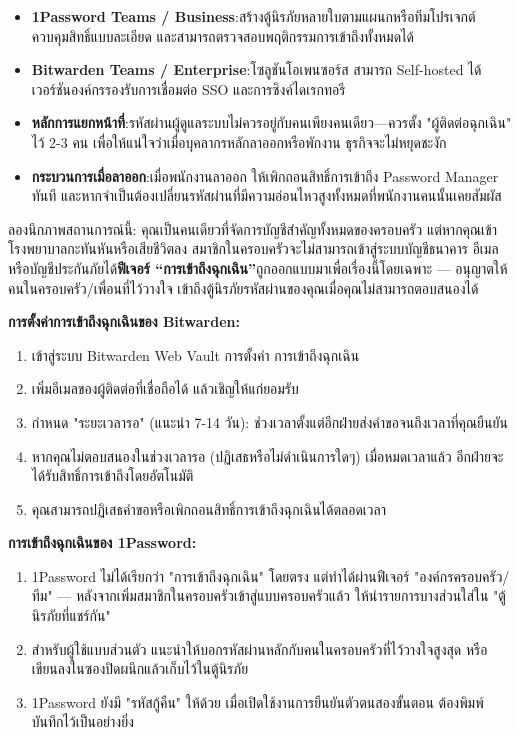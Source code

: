 \begin{itemize}
  \item \textbf{1Password Teams / Business}:สร้างตู้นิรภัยหลายใบตามแผนกหรือทีมโปรเจกต์ ควบคุมสิทธิ์แบบละเอียด และสามารถตรวจสอบพฤติกรรมการเข้าถึงทั้งหมดได้
  \item \textbf{Bitwarden Teams / Enterprise}:โซลูชันโอเพนซอร์ส สามารถ Self-hosted ได้ เวอร์ชันองค์กรรองรับการเชื่อมต่อ SSO และการซิงค์ไดเรกทอรี
  \item \textbf{หลักการแยกหน้าที่}:รหัสผ่านผู้ดูแลระบบไม่ควรอยู่กับคนเพียงคนเดียว—ควรตั้ง "ผู้ติดต่อฉุกเฉิน" ไว้ 2-3 คน เพื่อให้แน่ใจว่าเมื่อบุคลากรหลักลาออกหรือพักงาน ธุรกิจจะไม่หยุดชะงัก
  \item \textbf{กระบวนการเมื่อลาออก}:เมื่อพนักงานลาออก ให้เพิกถอนสิทธิ์การเข้าถึง Password Manager ทันที และหากจำเป็นต้องเปลี่ยนรหัสผ่านที่มีความอ่อนไหวสูงทั้งหมดที่พนักงานคนนั้นเคยสัมผัส
\end{itemize}


ลองนึกภาพสถานการณ์นี้: คุณเป็นคนเดียวที่จัดการบัญชีสำคัญทั้งหมดของครอบครัว แต่หากคุณเข้าโรงพยาบาลกะทันหันหรือเสียชีวิตลง สมาชิกในครอบครัวจะไม่สามารถเข้าสู่ระบบบัญชีธนาคาร อีเมล หรือบัญชีประกันภัยได้\textbf{ฟีเจอร์ “การเข้าถึงฉุกเฉิน”}ถูกออกแบบมาเพื่อเรื่องนี้โดยเฉพาะ — อนุญาตให้คนในครอบครัว/เพื่อนที่ไว้วางใจ เข้าถึงตู้นิรภัยรหัสผ่านของคุณเมื่อคุณไม่สามารถตอบสนองได้

\textbf{การตั้งค่าการเข้าถึงฉุกเฉินของ Bitwarden:}

\begin{enumerate}
  \item เข้าสู่ระบบ Bitwarden Web Vault การตั้งค่า การเข้าถึงฉุกเฉิน
  \item เพิ่มอีเมลของผู้ติดต่อที่เชื่อถือได้ แล้วเชิญให้แก่ยอมรับ
  \item กำหนด "ระยะเวลารอ" (แนะนำ 7-14 วัน): ช่วงเวลาตั้งแต่อีกฝ่ายส่งคำขอจนถึงเวลาที่คุณยืนยัน
  \item หากคุณไม่ตอบสนองในช่วงเวลารอ (ปฏิเสธหรือไม่ดำเนินการใดๆ) เมื่อหมดเวลาแล้ว อีกฝ่ายจะได้รับสิทธิ์การเข้าถึงโดยอัตโนมัติ
  \item คุณสามารถปฏิเสธคำขอหรือเพิกถอนสิทธิ์การเข้าถึงฉุกเฉินได้ตลอดเวลา
\end{enumerate}

\textbf{การเข้าถึงฉุกเฉินของ 1Password:}

\begin{enumerate}
  \item 1Password ไม่ได้เรียกว่า "การเข้าถึงฉุกเฉิน" โดยตรง แต่ทำได้ผ่านฟีเจอร์ "องค์กรครอบครัว/ทีม" — หลังจากเพิ่มสมาชิกในครอบครัวเข้าสู่แบบครอบครัวแล้ว ให้นำรายการบางส่วนใส่ใน "ตู้นิรภัยที่แชร์กัน"
  \item สำหรับผู้ใช้แบบส่วนตัว แนะนำให้บอกรหัสผ่านหลักกับคนในครอบครัวที่ไว้วางใจสูงสุด หรือเขียนลงในซองปิดผนึกแล้วเก็บไว้ในตู้นิรภัย
  \item 1Password ยังมี "รหัสกู้คืน" ให้ด้วย เมื่อเปิดใช้งานการยืนยันตัวตนสองขั้นตอน ต้องพิมพ์บันทึกไว้เป็นอย่างยิ่ง
\end{enumerate}

